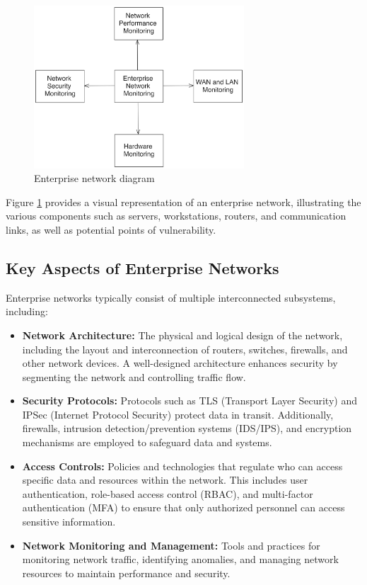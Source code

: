 \begin{figure}
    \centering
    \includegraphics[width=0.7\textwidth]{../Thesis_Docs/media/enterprise_network_diagram.png}
    \caption{Enterprise network diagram}
    \label{fig:enterprise_network_diagram}
\end{figure}

Figure \ref{fig:enterprise_network_diagram} provides a visual representation of an enterprise network, illustrating the various components such as servers, workstations, routers, and communication links, as well as potential points of vulnerability.

\subsection{Key Aspects of Enterprise Networks}

Enterprise networks typically consist of multiple interconnected subsystems, including:

\begin{itemize}
    \item \textbf{Network Architecture:} The physical and logical design of the network, including the layout and interconnection of routers, switches, firewalls, and other network devices. A well-designed architecture enhances security by segmenting the network and controlling traffic flow.
    \item \textbf{Security Protocols:} Protocols such as TLS (Transport Layer Security) and IPSec (Internet Protocol Security) protect data in transit. Additionally, firewalls, intrusion detection/prevention systems (IDS/IPS), and encryption mechanisms are employed to safeguard data and systems.
    \item \textbf{Access Controls:} Policies and technologies that regulate who can access specific data and resources within the network. This includes user authentication, role-based access control (RBAC), and multi-factor authentication (MFA) to ensure that only authorized personnel can access sensitive information.
    \item \textbf{Network Monitoring and Management:} Tools and practices for monitoring network traffic, identifying anomalies, and managing network resources to maintain performance and security.
\end{itemize}

